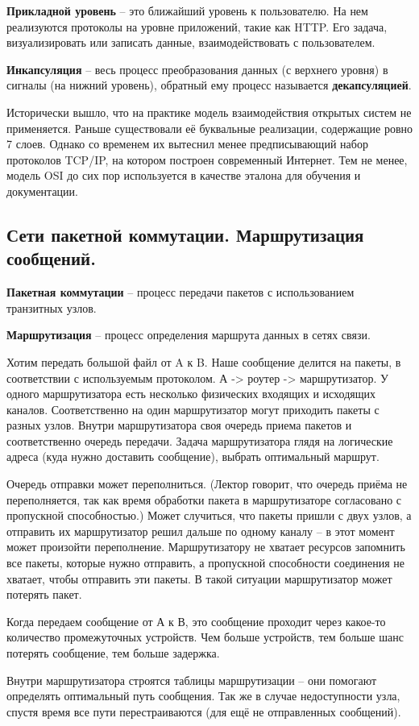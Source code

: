 \textbf{Прикладной уровень} -- это ближайший уровень к пользователю. На нем реализуются протоколы на уровне приложений, такие как HTTP.  Его задача, визуализировать или записать данные, взаимодействовать с пользователем.

\textbf{Инкапсуляция} -- весь процесс преобразования данных (с верхнего уровня) в сигналы (на нижний уровень), обратный ему процесс называется \textbf{декапсуляцией}.

Исторически вышло, что на практике модель взаимодействия открытых систем не применяется. Раньше существовали её буквальные реализации, содержащие ровно 7 слоев. Однако со временем их вытеснил менее предписывающий набор протоколов TCP/IP, на котором построен современный Интернет. Тем не менее, модель OSI до сих пор используется в качестве эталона для обучения и документации.


\subsection*{Сети пакетной коммутации. Маршрутизация сообщений.}\label{b17:part2}

\textbf{Пакетная коммутации} -- процесс передачи пакетов с использованием транзитных узлов.

\textbf{Маршрутизация} -- процесс определения маршрута данных в сетях связи.

Хотим передать большой файл от A к B. Наше сообщение делится на пакеты, в соответствии с используемым протоколом.
А -> роутер -> маршрутизатор.
У одного маршрутизатора есть несколько физических входящих и исходящих каналов. Соответственно на один маршрутизатор могут приходить пакеты с разных узлов. Внутри маршрутизатора своя очередь приема пакетов и соответственно очередь передачи.
Задача маршрутизатора глядя на логические адреса (куда нужно доставить сообщение), выбрать оптимальный маршрут.

Очередь отправки может переполниться. (Лектор говорит, что очередь приёма не переполняется, так как время обработки пакета в маршрутизаторе согласовано с пропускной способностью.) Может случиться, что пакеты пришли с двух узлов, а отправить их маршрутизатор решил дальше по одному каналу -- в этот момент может произойти переполнение.
Маршрутизатору не хватает ресурсов запомнить все пакеты, которые нужно отправить, а пропускной способности соединения не хватает, чтобы отправить эти пакеты. В такой ситуации маршрутизатор может потерять пакет.

Когда передаем сообщение от А к В, это сообщение проходит через какое-то количество промежуточных устройств. Чем больше устройств, тем больше шанс потерять сообщение, тем больше задержка.

Внутри маршрутизатора строятся таблицы маршрутизации -- они помогают определять оптимальный путь сообщения. Так же в случае недоступности узла, спустя время все пути перестраиваются (для ещё не отправленных сообщений).